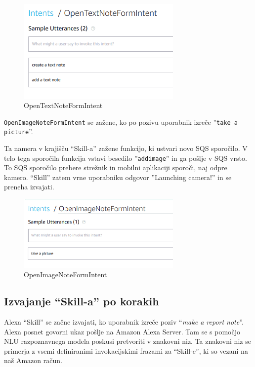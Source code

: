 \documentclass[a4paper, 12pt]{book}
\begin{document}
\begin{figure}[H]
\begin{center}
\includegraphics[width=8cm]{intent_text}
\end{center}
\caption{OpenTextNoteFormIntent}
\label{OpenTextNoteFormIntent}
\end{figure}

\texttt{OpenImageNoteFormIntent} se zažene, ko po pozivu uporabnik izreče ''\texttt{take a picture}''.

Ta namera v krajišču \enquote{Skill-a} zažene funkcijo, ki ustvari novo SQS sporočilo.
V telo tega sporočila funkcija vstavi besedilo ''\texttt{addimage}'' in ga pošlje v SQS vrsto.
To SQS sporočilo prebere strežnik in mobilni aplikaciji sporoči, naj odpre kamero.
\enquote{Skill} zatem vrne uporabniku odgovor ''Launching camera!'' in se preneha izvajati.

\begin{figure}[H]
\begin{center}
\includegraphics[width=8cm]{intent_image}
\end{center}
\caption{OpenImageNoteFormIntent}
\label{OpenImageNoteFormIntent}
\end{figure}

\subsection{Izvajanje \enquote{Skill-a} po korakih}

Alexa \enquote{Skill} se začne izvajati, ko uporabnik izreče poziv \enquote{\textit{make a report note}}.
Alexa posnet govorni ukaz pošlje na Amazon Alexa Server.
Tam se s pomočjo NLU razpoznavnega modela poskusi pretvoriti v znakovni niz.
Ta znakovni niz se primerja z vsemi definiranimi invokacijskimi frazami za \enquote{Skill-e}, ki so vezani na naš Amazon račun.
\end{document}
